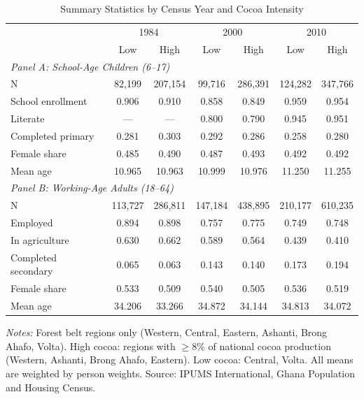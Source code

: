 \begin{table}[htbp]
\centering
\caption{Summary Statistics by Census Year and Cocoa Intensity}
\label{tab:summary}
\begin{tabular}{lcccccc}
\hline\hline
& \multicolumn{2}{c}{1984} & \multicolumn{2}{c}{2000} & \multicolumn{2}{c}{2010} \\
& Low & High & Low & High & Low & High \\
\hline
\multicolumn{7}{l}{\textit{Panel A: School-Age Children (6--17)}} \\
N & 82,199 & 207,154 & 99,716 & 286,391 & 124,282 & 347,766 \\
School enrollment & 0.906 & 0.910 & 0.858 & 0.849 & 0.959 & 0.954 \\
Literate & --- & --- & 0.800 & 0.790 & 0.945 & 0.951 \\
Completed primary & 0.281 & 0.303 & 0.292 & 0.286 & 0.258 & 0.280 \\
Female share & 0.485 & 0.490 & 0.487 & 0.493 & 0.492 & 0.492 \\
Mean age & 10.965 & 10.963 & 10.999 & 10.976 & 11.250 & 11.255 \\
\hline
\multicolumn{7}{l}{\textit{Panel B: Working-Age Adults (18--64)}} \\
N & 113,727 & 286,811 & 147,184 & 438,895 & 210,177 & 610,235 \\
Employed & 0.894 & 0.898 & 0.757 & 0.775 & 0.749 & 0.748 \\
In agriculture & 0.630 & 0.662 & 0.589 & 0.564 & 0.439 & 0.410 \\
Completed secondary & 0.065 & 0.063 & 0.143 & 0.140 & 0.173 & 0.194 \\
Female share & 0.533 & 0.509 & 0.540 & 0.505 & 0.536 & 0.519 \\
Mean age & 34.206 & 33.266 & 34.872 & 34.144 & 34.813 & 34.072 \\
\hline\hline
\end{tabular}
\begin{minipage}{0.95\textwidth}
\vspace{0.2cm}
\footnotesize
\textit{Notes:} Forest belt regions only (Western, Central, Eastern, Ashanti, Brong Ahafo, Volta). High cocoa: regions with $\geq$8\% of national cocoa production (Western, Ashanti, Brong Ahafo, Eastern). Low cocoa: Central, Volta. All means are weighted by person weights. Source: IPUMS International, Ghana Population and Housing Census.
\end{minipage}
\end{table}
